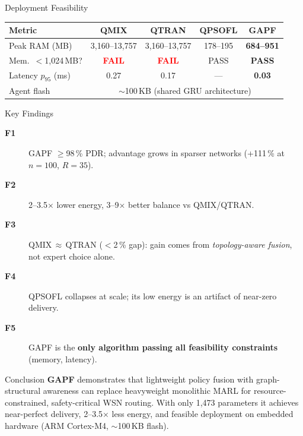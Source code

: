 \documentclass[final]{beamer}
\newlength{\colwidth}
\begin{document}
\begin{frame}[t]
\begin{columns}[t]
\begin{column}{\colwidth}
  \begin{block}{Deployment Feasibility}
    \footnotesize
    \begin{table}
      \centering
      \begin{tabular}{l|cccc}
        \toprule
        \textbf{Metric} & \textbf{QMIX} & \textbf{QTRAN} & \textbf{QPSOFL} & \textbf{GAPF} \\
        \midrule
        Peak RAM (MB) & 3,160--13,757 & 3,160--13,757 & 178--195 & \textbf{684--951} \\
        Mem.\ $<$1,024\,MB? & \textcolor{red}{\textbf{FAIL}} & \textcolor{red}{\textbf{FAIL}} & PASS & \textbf{PASS} \\
        Latency $p_{95}$ (ms) & 0.27 & 0.17 & --- & \textbf{0.03} \\
        Agent flash & \multicolumn{4}{c}{$\sim$100\,KB (shared GRU architecture)} \\
        \bottomrule
      \end{tabular}
    \end{table}
  \end{block}

  \begin{block}{Key Findings}
    \begin{description}
      \item[\textbf{F1}] GAPF $\geq$98\,\% PDR; advantage grows in sparser networks (+111\,\% at $n\!=\!100$, $R\!=\!35$).
      \item[\textbf{F2}] 2--3.5$\times$ lower energy, 3--9$\times$ better balance vs QMIX/QTRAN.
      \item[\textbf{F3}] QMIX\,$\approx$\,QTRAN ($<$2\,\% gap): gain comes from \emph{topology-aware fusion}, not expert choice alone.
      \item[\textbf{F4}] QPSOFL collapses at scale; its low energy is an artifact of near-zero delivery.
      \item[\textbf{F5}] GAPF is the \textbf{only algorithm passing all feasibility constraints} (memory, latency).
    \end{description}
  \end{block}

  \begin{block}{Conclusion}
    \textbf{GAPF} demonstrates that lightweight policy fusion with graph-structural awareness can replace heavyweight monolithic MARL for resource-constrained, safety-critical WSN routing.
    With only 1,473 parameters it achieves near-perfect delivery, 2--3.5$\times$ less energy, and feasible deployment on embedded hardware (ARM Cortex-M4, $\sim$100\,KB flash).


\end{block}
\end{column}
\end{columns}
\end{frame}
\end{document}
